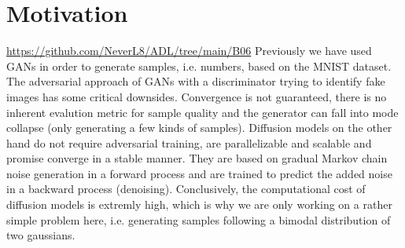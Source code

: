 \chapter{Motivation}
\url{https://github.com/NeverL8/ADL/tree/main/B06}\vspace{1cm}\newline
Previously we have used GANs in order to generate samples, i.e. numbers, based on the MNIST dataset. The adversarial approach of GANs with
a discriminator trying to identify fake images has some critical downsides. Convergence is not guaranteed, there is no inherent evalution metric
for sample quality and the generator can fall into mode collapse (only generating a few kinds of samples).
Diffusion models on the other hand do not require adversarial training, are parallelizable and scalable and promise converge in a stable manner.
They are based on gradual Markov chain noise generation in a forward process and are trained to predict the
added noise in a backward process (denoising).
Conclusively, the computational cost of diffusion models is extremly high, which is why we are only working on a rather simple problem here, i.e.
generating samples following a bimodal distribution of two gaussians.
